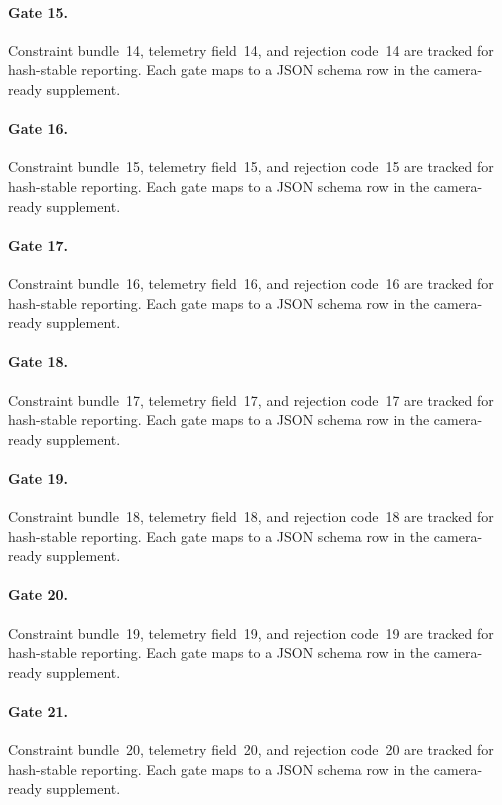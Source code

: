 \documentclass[sigconf,nonacm]{acmart}
\begin{document}
\paragraph{Gate 15.}
Constraint bundle~14, telemetry field~14, and rejection code~14 are tracked for hash-stable reporting. Each gate maps to a JSON schema row in the camera-ready supplement. %

\paragraph{Gate 16.}
Constraint bundle~15, telemetry field~15, and rejection code~15 are tracked for hash-stable reporting. Each gate maps to a JSON schema row in the camera-ready supplement. %

\paragraph{Gate 17.}
Constraint bundle~16, telemetry field~16, and rejection code~16 are tracked for hash-stable reporting. Each gate maps to a JSON schema row in the camera-ready supplement. %

\paragraph{Gate 18.}
Constraint bundle~17, telemetry field~17, and rejection code~17 are tracked for hash-stable reporting. Each gate maps to a JSON schema row in the camera-ready supplement. %

\paragraph{Gate 19.}
Constraint bundle~18, telemetry field~18, and rejection code~18 are tracked for hash-stable reporting. Each gate maps to a JSON schema row in the camera-ready supplement. %

\paragraph{Gate 20.}
Constraint bundle~19, telemetry field~19, and rejection code~19 are tracked for hash-stable reporting. Each gate maps to a JSON schema row in the camera-ready supplement. %

\paragraph{Gate 21.}
Constraint bundle~20, telemetry field~20, and rejection code~20 are tracked for hash-stable reporting. Each gate maps to a JSON schema row in the camera-ready supplement. %
\end{document}
